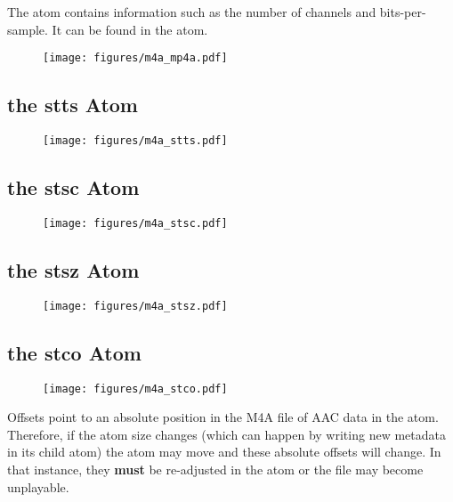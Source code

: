 The  atom contains information such as the number of channels
and bits-per-sample.  It can be found in the  atom.

\begin{figure}[h]
\texttt{[image: figures/m4a\_mp4a.pdf]}
\end{figure}

\pagebreak

\subsection{the stts Atom}

\begin{figure}[h]
\texttt{[image: figures/m4a\_stts.pdf]}
\end{figure}

\subsection{the stsc Atom}

\begin{figure}[h]
\texttt{[image: figures/m4a\_stsc.pdf]}
\end{figure}

\subsection{the stsz Atom}

\begin{figure}[h]
\texttt{[image: figures/m4a\_stsz.pdf]}
\end{figure}

\pagebreak

\subsection{the stco Atom}

\begin{figure}[h]
\texttt{[image: figures/m4a\_stco.pdf]}
\end{figure}
\par
\noindent
Offsets point to an absolute position in the M4A file of AAC data in
the  atom.  Therefore, if the  atom size changes
(which can happen by writing new metadata in its  child atom)
the  atom may move and these absolute offsets will change.
In that instance, they \textbf{must}
be re-adjusted in the  atom or the file may become unplayable.

